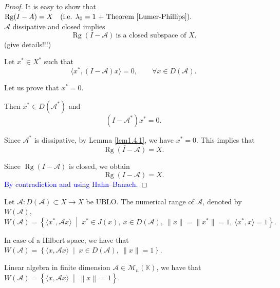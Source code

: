 \documentclass[12pt, oneside]{book}
\newcommand{\norm}[1]{\left\lVert#1\right\rVert}
\newcommand{\A}{\mathscr{A}}
\begin{document}
\begin{proof}
It is easy to show that
$
\operatorname{Rg}(I - A) = X
\quad
(\text{i.e. } \lambda_0 = 1 \text{ + Theorem \ref{Lumer-Phillips}}).
$\\
$\mathscr{A}$ dissipative and closed implies
\[
\operatorname{Rg}(I - \mathscr{A})
\ \text{is a closed subspace of } X.
\]
(give details!!!)

\medskip

Let $x^* \in X^*$ such that
\[
\langle x^*, (I - \mathscr{A})x \rangle = 0,
\qquad
\forall x \in D(\mathscr{A}).
\tag{$**$}
\]

Let us prove that $x^* = 0$.

\medskip

Then $x^* \in D(\mathscr{A}^*)$ and
\[
(I - \mathscr{A}^*)x^* = 0.
\]

Since $\mathscr{A}^*$ is dissipative, by Lemma \ref{lem1.4.1}, we have 
$
x^* = 0.
$
This implies that
\[
\overline{\operatorname{Rg}(I - \mathscr{A})} = X.
\]

\medskip

Since $\operatorname{Rg}(I - \mathscr{A})$ is closed,
we obtain
\[
\operatorname{Rg}(I - \mathscr{A}) = X.
\]
\textcolor{blue}{By contradiction and using Hahn--Banach.}
\end{proof}


\begin{definition}
Let
$
\mathscr{A}: D(\mathscr{A}) \subset X \longrightarrow X
$
be UBLO. The numerical range of $\mathscr{A}$, denoted by $W(\mathscr{A})$,
\vspace{-3mm}	
\[
W(\mathscr{A})
=
\left\{
\langle x^*, \mathscr{A}x \rangle
\; \middle| \;
x^* \in J(x),\ x \in D(\mathscr{A}),
\ \|x\| = \|x^*\| = 1,
\ \langle x^*, x \rangle = 1
\right\}.
\]

\medskip

In case of a Hilbert space, we have that
$
W(\mathscr{A})
=
\left\{
\langle x, \mathscr{A}x \rangle
\; \middle| \;
x \in D(\mathscr{A}),\ \|x\| = 1
\right\}.
$

\medskip

Linear algebra in finite dimension $\mathscr{A} \in \mathcal{M}_n(\mathbb{K})$, we have that $W(\A) = \left\{ \langle x, \A x \rangle \; \middle| \; \norm{x} = 1 \right\}$.

\end{definition}
\end{document}
